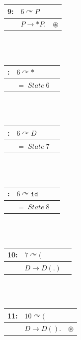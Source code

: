 \documentclass[fleqn]{article}
\begin{document}
\begin{enumerate}
  \begin{tabular}{| l   l  c |}
  \hline
  9: & $6 \curvearrowright P$ &               \\
  \hline
  \hline
     & $P \rightarrow *P.$    & $\circledast$ \\
  \hline
  \end{tabular}\\\\

  \begin{tabular}{| l   l  c |}
  \hline
   : & $6 \curvearrowright *$ & \\
  \hline
  \hline
     & $= \; State \; 6$            & \\
  \hline
  \end{tabular}\\\\

  \begin{tabular}{| l   l  c |}
  \hline
    : & $6 \curvearrowright D$ &               \\
  \hline
  \hline
      & $= \; State \; 7$      &               \\
  \hline
  \end{tabular}\\\\

  \begin{tabular}{| l   l  c |}
  \hline
    : & $6 \curvearrowright \texttt{id}$ &               \\
  \hline
  \hline
      & $= \; State \; 8$                &               \\
  \hline
  \end{tabular}\\\\

  \begin{tabular}{| l   l  c |}
  \hline
  10: & $7 \curvearrowright ($   & \\
  \hline
  \hline
      & $D \rightarrow D(.)$     & \\
  \hline
  \end{tabular}\\\\

  \begin{tabular}{| l   l  c |}
  \hline
  11: & $10 \curvearrowright ($   &               \\
  \hline
  \hline
      & $D \rightarrow D().$      & $\circledast$ \\
  \hline
  \end{tabular}\\\\


\end{enumerate}
\end{document}
